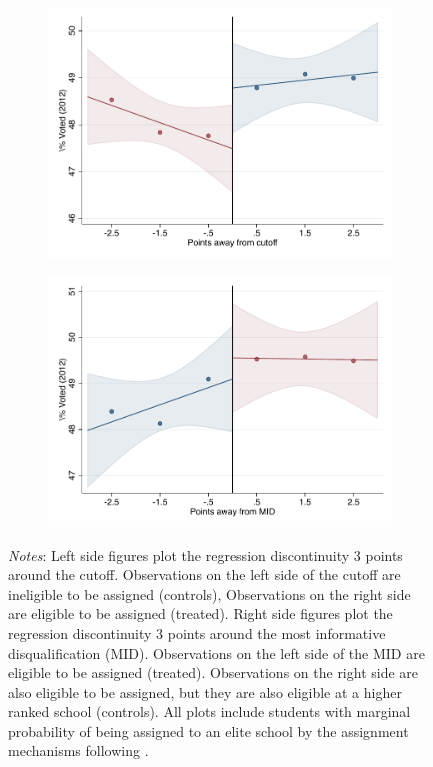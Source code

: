 \documentclass[oneside,11pt]{article}
\begin{document}
\begin{figure}[H]
\begin{center}
    \begin{subfigure}{0.475\textwidth}
        \centering
        \includegraphics[width=\textwidth]{04_Figures/rd_plot_tau_Voto_Marcado_2012_IPN3.pdf}
    \end{subfigure}
    \begin{subfigure}{0.475\textwidth}
        \centering
        \includegraphics[width=\textwidth]{04_Figures/rd_plot_mid_Voto_Marcado_2012_IPN3.pdf}
    \end{subfigure}
    \end{center}
    
\footnotesize
\textit{Notes}: Left side figures plot the regression discontinuity 3 points around the cutoff. Observations on the left side of the cutoff are ineligible to be assigned (controls), Observations on the right side are eligible to be assigned (treated). Right side figures plot the regression discontinuity 3 points around the most informative disqualification (MID). Observations on the left side of the MID are eligible to be assigned (treated). Observations on the right side are also eligible to be assigned, but they are also eligible at a higher ranked school (controls). All plots include students with marginal probability of being assigned to an elite school by the assignment mechanisms following \citet{abdulkadirouglu2022breaking}. 
\end{figure}
\end{document}
